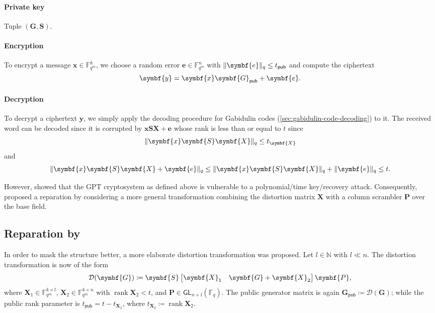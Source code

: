 \documentclass[version=last, paper=A4, parskip=half, oneside]{scrbook}
\theoremstyle{plain}
\theoremstyle{definition}
\theoremstyle{remark}
\renewcommand*{\vec}{\symbf}
\newcommand*{\mat}{\symbf}
\DeclareMathOperator{\rank}{rank}
\newcommand*{\GL}{\ensuremath{\mathsf{GL}}}
\newcommand*{\pub}{\ensuremath{\mathsf{pub}}}
\newcommand*{\FF}{\ensuremath{\mathbb{F}}}
\newcommand*{\NN}{\ensuremath{\mathbb{N}}}
\DeclarePairedDelimiter{\norm}{\lVert}{\rVert}
\newcommand*{\normR}[2]{\ensuremath{\norm{#1}_{#2}}}
\begin{document}
\paragraph{Private key} Tuple \((\mat{G}, \mat{S})\).

\paragraph{Encryption} To encrypt a message \(\vec{x} \in \FF_{q^m}^k\), we
choose a random error \(\vec{e} \in \FF_{q^m}^n\) with
\(\normR{\vec{e}}{q} \le t_{\pub}\) and compute the ciphertext
\[
  \vec{y} = \vec{x} \mat{G}_{\pub} + \vec{e}\text.
\]

\paragraph{Decryption} To decrypt a ciphertext \(\vec{y}\), we simply apply the
decoding procedure for Gabidulin codes (\cref{sec:gabidulin-code-decoding}) to
it.  The received word can be decoded since it is corrupted by
\(\vec{x} \mat{S} \mat{X} + \vec{e}\) whose rank is less than or equal to \(t\)
since
\[
  \normR{\vec{x} \mat{S} \mat{X}}{q} \le t_{\mat{X}}
\]
and
\[
  \normR{\vec{x} \mat{S} \mat{X} + \vec{e}}{q} \le
  \normR{\vec{x} \mat{S} \mat{X}}{q} + \normR{\vec{e}}{q} \le
  t\text.
\]

However, \textcites{Gib95, Gib96} showed that the GPT cryptosystem as defined
above is vulnerable to a polynomial\-/time key\-/recovery attack.  Consequently,
\textcite{GO01} proposed a reparation by considering a more general
transformation combining the distortion matrix \(\mat{X}\) with a column
scrambler \(\mat{P}\) over the base field.

\subsection{Reparation by \texorpdfstring{\textcite{GO01}}{Gabidulin and
    Ourivski}}

In order to mask the structure better, a more elaborate distortion
transformation was proposed.  Let \(l \in \NN\) with \(l \ll n\).  The
distortion transformation is now of the form
\begin{equation}\label{eq:distortion-transformation}
  \mathcal{D}(\mat{G}) \coloneqq
  \mat{S}
  \begin{bmatrix} \mat{X}_1 & \mat{G} + \mat{X}_2 \end{bmatrix}
  \mat{P}\text,
\end{equation}
where \(\mat{X}_1 \in \FF_{q^m}^{k \times l}\),
\(\mat{X}_2 \in \FF_{q^m}^{k \times n}\) with \(\rank \mat{X}_2 < t\), and
\(\mat{P} \in \GL_{n + l}(\FF_q)\).  The public generator matrix is again
\(\mat{G}_{\pub} \coloneqq \mathcal{D}(\mat{G})\); while the public rank
parameter is \(t_{\pub} = t - t_{\mat{X}_2}\), where
\(t_{\mat{X}_2} \coloneqq \rank \mat{X}_2\).
\end{document}
